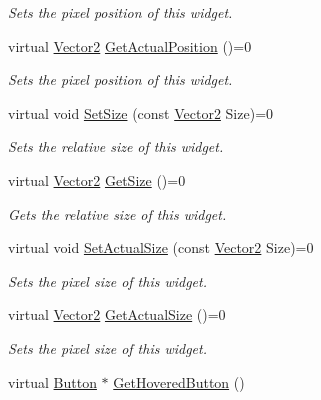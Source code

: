 \begin{DoxyCompactItemize}
\begin{DoxyCompactList}\small\item\em Sets the pixel position of this widget. \item\end{DoxyCompactList}\item 
virtual \hyperlink{classphys_1_1Vector2}{Vector2} \hyperlink{classphys_1_1UI_1_1Widget_a0a29fecff7f56d7909f65fd63b0990e7}{GetActualPosition} ()=0
\begin{DoxyCompactList}\small\item\em Sets the pixel position of this widget. \item\end{DoxyCompactList}\item 
virtual void \hyperlink{classphys_1_1UI_1_1Widget_a3fe0b767fea59e1d120ed37b26c99044}{SetSize} (const \hyperlink{classphys_1_1Vector2}{Vector2} Size)=0
\begin{DoxyCompactList}\small\item\em Sets the relative size of this widget. \item\end{DoxyCompactList}\item 
virtual \hyperlink{classphys_1_1Vector2}{Vector2} \hyperlink{classphys_1_1UI_1_1Widget_a07039c19e57de314147ce066417da0a2}{GetSize} ()=0
\begin{DoxyCompactList}\small\item\em Gets the relative size of this widget. \item\end{DoxyCompactList}\item 
virtual void \hyperlink{classphys_1_1UI_1_1Widget_a8c942355474d0b250dfadd4dac4ae400}{SetActualSize} (const \hyperlink{classphys_1_1Vector2}{Vector2} Size)=0
\begin{DoxyCompactList}\small\item\em Sets the pixel size of this widget. \item\end{DoxyCompactList}\item 
virtual \hyperlink{classphys_1_1Vector2}{Vector2} \hyperlink{classphys_1_1UI_1_1Widget_af3a685621ed220748c0940ea38c96ed2}{GetActualSize} ()=0
\begin{DoxyCompactList}\small\item\em Sets the pixel size of this widget. \item\end{DoxyCompactList}\item 
virtual \hyperlink{classphys_1_1UI_1_1Button}{Button} $\ast$ \hyperlink{classphys_1_1UI_1_1Widget_ab563c13db418e4c3ff0a0dd766550251}{GetHoveredButton} ()

\end{DoxyCompactItemize}
